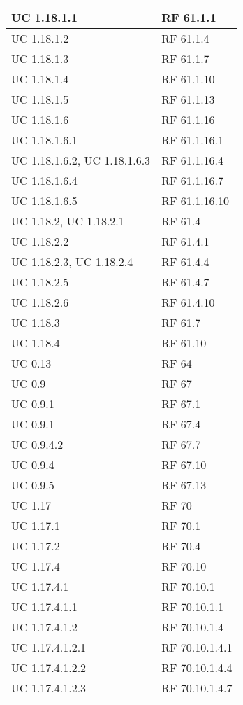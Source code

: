 {\begin{longtable} [c]{| p{4cm} | p{4cm} |}
 \hline 
UC 1.18.1.1 & RF 61.1.1\\ 
 \hline 
UC 1.18.1.2 & RF 61.1.4\\ 
 \hline 
UC 1.18.1.3 & RF 61.1.7\\ 
 \hline 
UC 1.18.1.4 & RF 61.1.10\\ 
 \hline 
UC 1.18.1.5 & RF 61.1.13\\ 
 \hline 
UC 1.18.1.6 & RF 61.1.16\\ 
 \hline 
UC 1.18.1.6.1 & RF 61.1.16.1\\ 
 \hline 
UC 1.18.1.6.2, UC 1.18.1.6.3 & RF 61.1.16.4\\ 
 \hline 
UC 1.18.1.6.4 & RF 61.1.16.7\\ 
 \hline 
UC 1.18.1.6.5 & RF 61.1.16.10\\ 
 \hline 
UC 1.18.2, UC 1.18.2.1 & RF 61.4\\ 
 \hline 
UC 1.18.2.2 & RF 61.4.1\\ 
 \hline 
UC 1.18.2.3, UC 1.18.2.4 & RF 61.4.4\\ 
 \hline 
UC 1.18.2.5 & RF 61.4.7\\ 
 \hline 
UC 1.18.2.6 & RF 61.4.10\\ 
 \hline 
UC 1.18.3 & RF 61.7\\ 
 \hline 
UC 1.18.4 & RF 61.10\\ 
 \hline 
UC 0.13 & RF 64\\ 
 \hline 
UC 0.9 & RF 67\\ 
 \hline 
UC 0.9.1 & RF 67.1\\ 
 \hline 
UC 0.9.1 & RF 67.4\\ 
 \hline 
UC 0.9.4.2 & RF 67.7\\ 
 \hline 
UC 0.9.4 & RF 67.10\\ 
 \hline 
UC 0.9.5 & RF 67.13\\ 
 \hline 
UC 1.17 & RF 70\\ 
 \hline 
UC 1.17.1 & RF 70.1\\ 
 \hline 
UC 1.17.2 & RF 70.4\\ 
 \hline 
UC 1.17.4 & RF 70.10\\ 
 \hline 
UC 1.17.4.1 & RF 70.10.1\\ 
 \hline 
UC 1.17.4.1.1 & RF 70.10.1.1\\ 
 \hline 
UC 1.17.4.1.2 & RF 70.10.1.4\\ 
 \hline 
UC 1.17.4.1.2.1 & RF 70.10.1.4.1\\ 
 \hline 
UC 1.17.4.1.2.2 & RF 70.10.1.4.4\\ 
 \hline 
UC 1.17.4.1.2.3 & RF 70.10.1.4.7\\ 

\end{longtable}}
